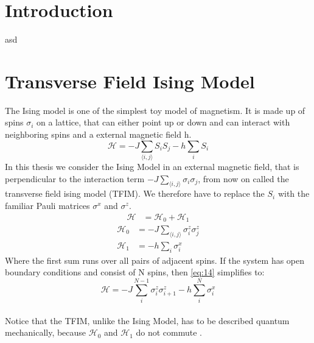 \documentclass{article}
\begin{document}
\tableofcontents


\section{Introduction}
asd
\section{Transverse Field Ising Model}
The Ising model is one of the simplest toy model of magnetism. It is
made up of spins $\sigma_i$ on a lattice, that can either point up or
down and can interact with neighboring spins and a external magnetic
field h.
\begin{equation}
\label{eq:18}
\mathcal{H} = -J \sum\limits_{\langle i,j \rangle} S_i S_j- h
\sum\limits_i S_i
\end{equation}
In this thesis we consider the Ising Model in an external magnetic
field, that is perpendicular to the interaction term $-J \sum_{\langle
i,j \rangle} \sigma_i \sigma_j$, from now on called the transverse
field ising model (TFIM). We therefore have to replace the $S_i$ with
the familiar Pauli matrices $\sigma^x$ and $\sigma^z$.
\begin{align}
\label{eq:14}
\mathcal{H} &= \mathcal{H}_0 + \mathcal{H}_1
\end{align}
\begin{align}
\label{eq:24}
\mathcal{H}_0 &= -J \sum\limits_{\langle i,j \rangle} \sigma_i^z \sigma_j ^z\\
\mathcal{H}_1 &= - h \sum\limits_i \sigma_i^x
\end{align}
Where the first sum runs over all pairs of adjacent spins. If the
system has open boundary conditions and consist of N spins, then
\eqref{eq:14} simplifies to:
\begin{equation}
\label{eq:19}
\mathcal{H} = -J \sum\limits_i^{N-1} \sigma_i^z \sigma_{i+1} ^z- h
\sum\limits_i^N \sigma_i^x
\end{equation}
\\
Notice that the TFIM, unlike the Ising Model, has to be described
quantum mechanically, because $\mathcal{H}_0$ and $\mathcal{H}_1$ do
not commute .\\
\end{document}
